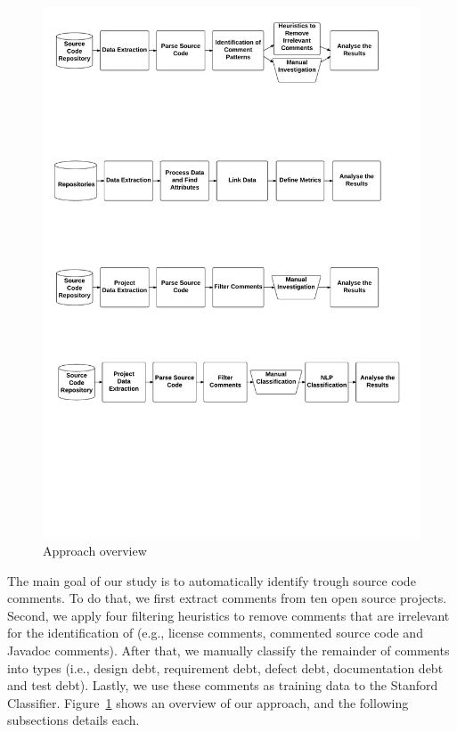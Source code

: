 \begin{figure}[thb!]
  \centering
  \includegraphics[width=1\textwidth]{figures/approach.pdf}
  \caption{Approach overview}
  \label{fig:approach}
\end{figure}

The main goal of our study is to automatically identify \SATD trough source code comments. To do that, we first extract comments from ten open source projects. Second, we apply four filtering heuristics to remove comments that are irrelevant for the identification of \SATD  (e.g., license comments, commented source code and Javadoc comments). After that, we manually classify the remainder of comments into \SATD types (i.e., design debt, requirement debt, defect debt, documentation debt and test debt). Lastly, we use these comments as training data to the Stanford  Classifier. Figure~\ref{fig:approach} shows an overview of our approach, and the following subsections details each.

